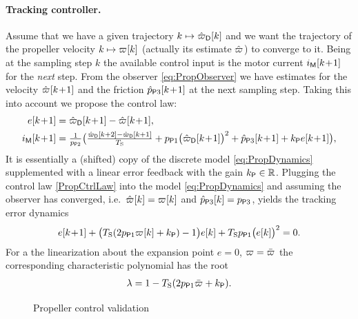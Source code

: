 \paragraph*{Tracking controller.}
Assume that we have a given trajectory $k \mapsto \PropVelDF[][k]$ and we want the trajectory of the propeller velocity $k \mapsto \PropVel[][k]$ (actually its estimate $\PropVelObs$) to converge to it.
Being at the sampling step $k$ the available control input is the motor current $\BLDCCurr[][k\!+\!1]$ for the \textit{next} step.
From the observer \eqref{eq:PropObserver} we have estimates for the velocity $\PropVelObs[][k\!+\!1]$ and the friction $\PropParamObs[3][k\!+\!1]$ at the next sampling step.
Taking this into account we propose the control law:
\begin{subequations}\label{PropCtrlLaw}
\begin{align}
 e[k\!+\!1] &= \PropVelDF[][k\!+\!1] - \PropVelObs[][k\!+\!1],
\\
 \BLDCCurr[][k\!+\!1] &= \tfrac{1}{\PropParam[2]} \big( \tfrac{\PropVelDF[][k+2] - \PropVelDF[][k+1]}{\Ts} + \PropParam[1] \big( \PropVelDF[][k\!+\!1] \big)^2 + \PropParamObs[3][k\!+\!1] + \PropCtrlGain e[k\!+\!1] \big),
\end{align}
\end{subequations}
It is essentially a (shifted) copy of the discrete model \eqref{eq:PropDynamics} supplemented with a linear error feedback with the gain $\PropCtrlGain \in \RealNum$.
Plugging the control law \eqref{PropCtrlLaw} into the model \eqref{eq:PropDynamics} and assuming the observer has converged, i.e.\ $\PropVelObs[][k] = \PropVel[][k]$ and $\PropParamObs[3][k] = \PropParam[3]$, yields the tracking error dynamics
\begin{align}
 e[k\!+\!1] + \big( \Ts (2 \PropParam[1] \PropVel[][k] + \PropCtrlGain) - 1 \big) e[k] + \Ts \PropParam[1] \big( e[k] \big)^2 = 0.
\end{align}
For a the linearization about the expansion point $e = 0$, $\PropVel = \PropVelStat$ the corresponding characteristic polynomial has the root
\begin{align}
 \lambda = 1 - \Ts (2 \PropParam[1] \PropVelStat + \PropCtrlGain).
\end{align}


\begin{figure}
 \centering
 \footnotesize
 
 \caption{Propeller control validation}
 \label{fig:PropCtrlRes}
\end{figure}

